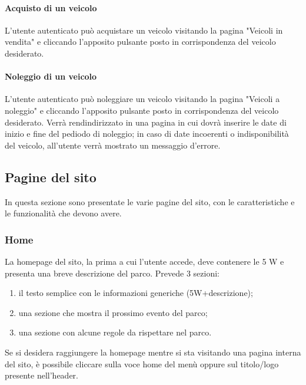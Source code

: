         \paragraph{Acquisto di un veicolo}
        L'utente autenticato può acquistare un veicolo visitando la pagina "Veicoli in vendita" e cliccando l'apposito pulsante posto in corrispondenza del veicolo desiderato.

        \paragraph{Noleggio di un veicolo}
        L'utente autenticato può noleggiare un veicolo visitando la pagina "Veicoli a noleggio" e cliccando l'apposito pulsante posto in corrispondenza del veicolo desiderato. Verrà rendindirizzato in una pagina in cui dovrà inserire le date di inizio e fine del pediodo di noleggio; in caso di date incoerenti o indisponibilità del veicolo, all'utente verrà mostrato un messaggio d'errore.

    \subsection{Pagine del sito}
        In questa sezione sono presentate le varie pagine del sito, con le caratteristiche e le funzionalità che devono avere.
        \subsubsection{Home}
            La homepage del sito, la prima a cui l'utente accede, deve contenere le 5 W e presenta una breve descrizione del parco.
            Prevede 3 sezioni:
            \begin{enumerate}
                \item il testo semplice con le informazioni generiche (5W+descrizione);
                \item una sezione che mostra il prossimo evento del parco;
                \item una sezione con alcune regole da rispettare nel parco.
            \end{enumerate}
            Se si desidera raggiungere la homepage mentre si sta visitando una pagina interna del sito, è possibile cliccare sulla voce home del menù oppure sul titolo/logo presente nell'header.


